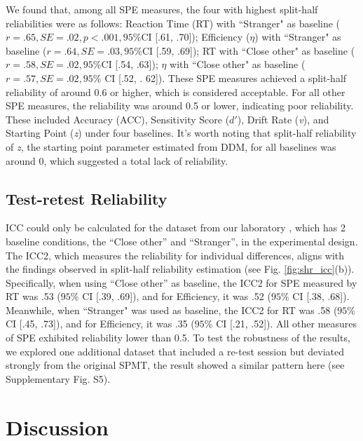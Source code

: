 \documentclass[sn-apa]{sn-jnl}%
\theoremstyle{thmstyleone}%
\theoremstyle{thmstyletwo}%
\theoremstyle{thmstylethree}%
\begin{document}
We found that, among all SPE measures, the four with highest split-half reliabilities were as follows: Reaction Time (RT) with ``Stranger" as baseline ($r = .65, SE = .02, p <.001, 95\% $CI [.61, .70]); Efficiency ($\eta$) with ``Stranger" as baseline ($r = .64, SE  = .03, 95\% $CI [.59, .69]); RT with ``Close other" as baseline ($r = .58, SE = .02, 95\% $CI [.54, .63]); $\eta$ with ``Close other" as baseline ($r = .57, SE = .02, 95\% $ CI [.52, . 62]). These SPE measures achieved a split-half reliability of around 0.6 or higher, which is considered acceptable. For all other SPE measures, the reliability was around 0.5 or lower, indicating poor reliability. These included Accuracy (ACC), Sensitivity Score ($d'$), Drift Rate (\textit{v}), and Starting Point (\textit{z}) under four baselines. It's worth noting that split-half reliability of \textit{z}, the starting point parameter estimated from DDM, for all baselines was around 0, which suggested a total lack of reliability.


\subsection{Test-retest Reliability}\label{subsec:testretest}

ICC could only be calculated for the dataset from our laboratory \parencite{hu2023data}, which has 2 baseline conditions, the ``Close other” and ``Stranger”, in the experimental design. The ICC2, which measures the reliability for individual differences, aligns with the findings observed in split-half reliability estimation (see Fig. \ref{fig:shr_icc}(b)). Specifically, when using ``Close other” as baseline, the ICC2 for SPE measured by RT was .53 ($95\%$ CI [.39, .69]), and for Efficiency, it was .52 ($95\%$ CI [.38, .68]). Meanwhile, when ``Stranger" was used as baseline, the ICC2 for RT was .58 ($95\%$ CI [.45, .73]), and for Efficiency, it was .35 ($95\%$ CI [.21, .52]). All other measures of SPE exhibited reliability lower than 0.5. To test the robustness of the results, we explored one additional dataset that included a re-test session but deviated strongly from the original SPMT, the result showed a similar pattern here (see Supplementary Fig. S5).
\clearpage

\section{Discussion}\label{sec5}
\end{document}
